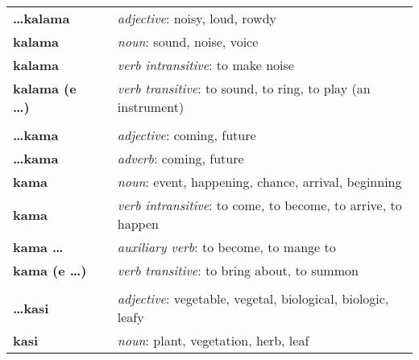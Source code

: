 \begin{supertabular}{p{2,5cm}|ll}
    \textbf{\dots kalama}        &  & \textit{adjective}: noisy, loud, rowdy                                                                     \\
    \textbf{kalama}              &  & \textit{noun}: sound, noise, voice                                                                         \\
    \textbf{kalama}              &  & \textit{verb intransitive}: to make noise                                                                  \\
    \textbf{kalama (e \dots)}    &  & \textit{verb transitive}: to sound, to ring, to play (an instrument)                                       \\
                                 &  &                                                                                                            \\
    \textbf{\dots kama}          &  & \textit{adjective}: coming, future                                                                         \\
    \textbf{\dots kama}          &  & \textit{adverb}: coming, future                                                                            \\
    \textbf{kama}                &  & \textit{noun}: event, happening, chance, arrival, beginning                                                \\
    \textbf{kama}                &  & \textit{verb intransitive}: to come, to become, to arrive, to happen                                       \\
    \textbf{kama \dots}          &  & \textit{auxiliary verb}: to become, to mange to                                                            \\
    \textbf{kama (e \dots)}      &  & \textit{verb transitive}: to bring about, to summon                                                        \\
                                 &  &                                                                                                            \\
    \textbf{\dots kasi}          &  & \textit{adjective}: vegetable, vegetal, biological, biologic, leafy                                        \\
    \textbf{kasi}                &  & \textit{noun}: plant, vegetation, herb, leaf                                                               \\

\end{supertabular}

